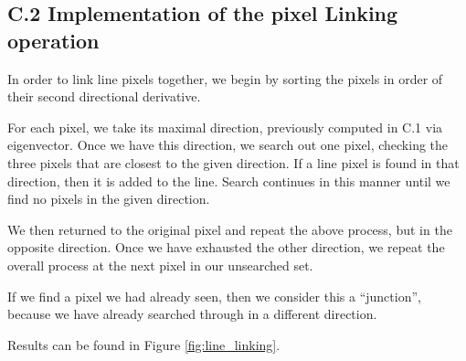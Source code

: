 \documentclass{article}
\begin{document}
\subsection*{C.2 Implementation of the pixel Linking operation}

In order to link line pixels together, we begin by sorting the pixels in order of their second directional derivative.

For each pixel, we take its maximal direction, previously computed in C.1 via eigenvector. Once we have this direction, we search out one pixel, checking the three pixels that are closest to the given direction. If a line pixel is found in that direction, then it is added to the line. Search continues in this manner until we find no pixels in the given direction.

We then returned to the original pixel and repeat the above process, but in the opposite direction. Once we have exhausted the other direction, we repeat the overall process at the next pixel in our unsearched set.

If we find a pixel we had already seen, then we consider this a ``junction'', because we have already searched through in a different direction.

Results can be found in Figure \ref{fig:line_linking}.
\end{document}
